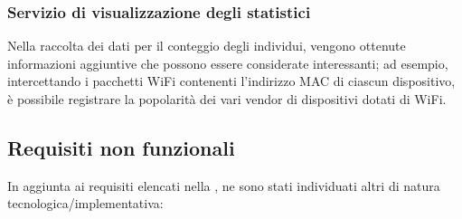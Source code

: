 \subsubsection{Servizio di visualizzazione degli statistici}

Nella raccolta dei dati per il conteggio degli individui, vengono ottenute informazioni aggiuntive che possono essere considerate interessanti;
ad esempio, intercettando i pacchetti WiFi contenenti l'indirizzo MAC di ciascun dispositivo, è possibile registrare la popolarità dei vari vendor di dispositivi dotati di WiFi.

\subsection{Requisiti non funzionali}

In aggiunta ai requisiti elencati nella , ne sono stati individuati altri di natura tecnologica/implementativa:

